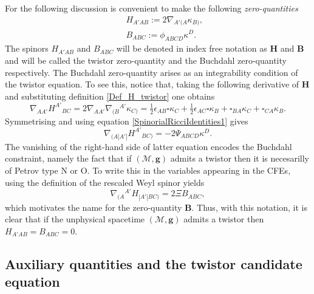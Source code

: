 \documentclass[10pt,a4paper]{article}
\theoremstyle{plain}
\def\bmg{{\bm g}}
\def\bmB{{\bm B}}
\def\bmH{{\bm H}}
\begin{document}
For the following discussion is convenient to make the following
\emph{zero-quantities}
\begin{subequations}
  \begin{eqnarray}
   && H_{A'AB} := 2
    \nabla_{A'(A}\kappa_{B)},\label{Def_H_twistor}\\ && B_{ABC}
    := \phi_{ABCD}\kappa^D.\label{Def_B_twistor}
    \end{eqnarray}
\end{subequations}
The spinors $H_{A'AB}$ and $B_{ABC}$ will be denoted in index free
notation as $\bmH$ and $\bmB$ and will be called the twistor
zero-quantity and the Buchdahl zero-quantity respectively.  The
Buchdahl zero-quantity arises as an integrability condition of the
twistor equation.  To see this, notice that, taking the following
derivative of $\bmH$ and substituting definition
\eqref{Def_H_twistor} one obtains
  \begin{equation}\label{curl_H_twistor}
  \nabla_{AA'}H^{A'}{}_{BC}= 2 \nabla_{AA'}\nabla_{(B}{}^{A'}\kappa
  _{C)} = \tfrac{1}{2} \epsilon _{AB} \square \kappa _{C}  +
  \tfrac{1}{2}  \epsilon _{AC} \square \kappa _{B} +
  \square_{BA}\kappa _{C} + \square_{CA}\kappa _{B}.
  \end{equation}
  Symmetrising and using equation \eqref{SpinorialRicciIdentities1} gives
  \[
  \nabla_{(A|A'|}H^{A'}{}_{BC)}= - 2\Psi_{ABCD}\kappa^D.
  \]
  The vanishing of the right-hand side of latter equation encodes the
  Buchdahl constraint, namely the fact that if $(\mathcal{M},\bmg)$
  admits a twistor then it is necesarilly of Petrov type N or O. To
  write this in the variables appearing in the CFEs,
  using the definition of the rescaled Weyl spinor
  yields
  \begin{equation}\label{Curl_H_sym_toB_twistor}
  \nabla_{(A}{}^{A'}H_{|A'|BC)} = 2\Xi B_{ABC},
  \end{equation}
  which motivates the name for the zero-quantity $\bmB$.
  Thus, with this notation, it is clear that if the unphysical spacetime
  $(\mathcal{M},\bmg)$ admits a twistor  then $H_{A'AB}=B_{ABC}=0$. 
  
\subsection{Auxiliary quantities and the twistor candidate equation}
  
\end{document}
